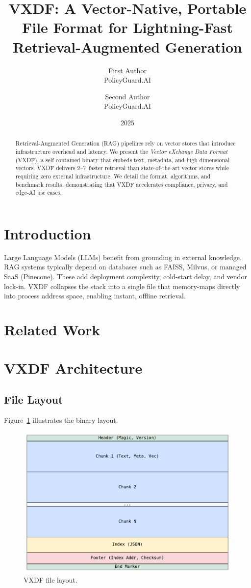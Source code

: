 \documentclass[10pt,twocolumn]{article}
\title{VXDF: A Vector-Native, Portable File Format for Lightning-Fast Retrieval-Augmented Generation}
\author{First Author\\ PolicyGuard.AI \and Second Author\\ PolicyGuard.AI}
\date{2025}
\begin{document}
\maketitle

\begin{abstract}
Retrieval-Augmented Generation (RAG) pipelines rely on vector stores that introduce infrastructure overhead and latency. We present the \emph{Vector eXchange Data Format} (VXDF), a self-contained binary that embeds text, metadata, and high-dimensional vectors. VXDF delivers 2--7\,\times{} faster retrieval than state-of-the-art vector stores while requiring zero external infrastructure. We detail the format, algorithms, and benchmark results, demonstrating that VXDF accelerates compliance, privacy, and edge-AI use cases.
\end{abstract}

\section{Introduction}
Large Language Models (LLMs) benefit from grounding in external knowledge. RAG systems typically depend on databases such as FAISS, Milvus, or managed SaaS (Pinecone). These add deployment complexity, cold-start delay, and vendor lock-in. VXDF collapses the stack into a single file that memory-maps directly into process address space, enabling instant, offline retrieval.

\section{Related Work}

\section{VXDF Architecture}
\subsection{File Layout}
Figure~\ref{fig:layout} illustrates the binary layout.
\begin{figure}[t]
    \centering
    \includegraphics[width=0.9\linewidth]{figures/vxdf_layout.pdf}
    \caption{VXDF file layout.}
    \label{fig:layout}
\end{figure}
\end{document}
